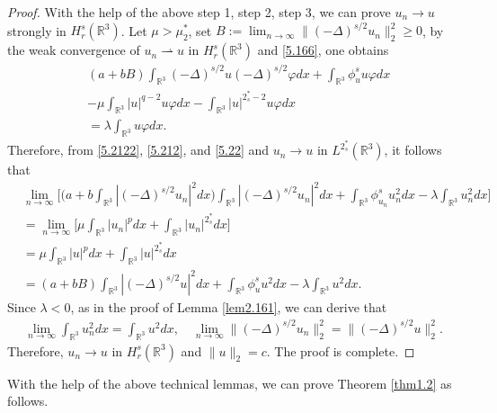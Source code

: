 \begin{proof}
With the help  of  the above step 1, step 2, step 3, we can prove $u_n\to u$ 
strongly in $H^s_r(\mathbb{R}^3)$. Let $\mu>\mu^*_2$, set 
$B:=\lim_{n\to\infty} \|(-\Delta)^{s/2}u_n\|^2_2\geq 0 $, by the weak convergence of 
$u_n\rightharpoonup u$ in  $H^s_r(\mathbb{R}^3)$ and  \eqref{5.166}, one obtains
\begin{equation}\label{5.22}
\begin{split}
&(a+bB)\int_{\mathbb{R}^3}(-\Delta)^{s/2}u(-\Delta)^{s/2}\varphi dx
 +\int_{\mathbb{R}^3}\phi^s_{u}u\varphi dx\\
&-\mu \int_{\mathbb{R}^3}|u|^{q-2}u\varphi dx
 -\int_{\mathbb{R}^3}|u|^{2^*_s-2}u\varphi dx \\
&=\lambda \int_{\mathbb{R}^3} u\varphi dx.
\end{split}
\end{equation}
Therefore, from \eqref{5.2122}, \eqref{5.212}, and \eqref{5.22} and 
$u_n\to u$ in $L^{2^*_s}(\mathbb{R}^3)$, it follows that
\begin{align*} %
&\lim_{n\to\infty}\Big[\Big(a+b\int_{\mathbb{R}^3}|(-\Delta)^{s/2}u_n|^2dx\Big)
 \int_{\mathbb{R}^3}|(-\Delta)^{s/2}u_n|^2 dx
 +\int_{\mathbb{R}^3}\phi^s_{u_n}{u^2_n}dx
 -\lambda \int_{\mathbb{R}^3} {u^2_n} dx\Big]\\
&=\lim_{n\to\infty}\Big [\mu \int_{\mathbb{R}^3}|u_n|^{p}dx
 +\int_{\mathbb{R}^3}|u_n|^{2^*_s} dx\Big]\\
&=\mu \int_{\mathbb{R}^3}|u|^{p}dx+\int_{\mathbb{R}^3}|u|^{2^*_s} dx\\
&=(a+bB)\int_{\mathbb{R}^3}|(-\Delta)^{s/2}u|^2 dx
 +\int_{\mathbb{R}^3}\phi^s_{u}{u^2}dx
 -\lambda \int_{\mathbb{R}^3} {u^2} dx.
\end{align*}
Since $\lambda<0$, as in the proof of Lemma {\ref{lem2.161}},  
we can derive that
\begin{align*} %
\lim_{n\to\infty} \int_{\mathbb{R}^3} {u^2_n} dx
= \int_{\mathbb{R}^3} {u^2} dx,\quad
\lim_{n\to\infty}  \|(-\Delta)^{s/2}u_n\|^2_2 = \|(-\Delta)^{s/2}u\|^2_2.
\end{align*}
Therefore, $u_n\to u$ in $H^s_{r}(\mathbb{R}^3)$ and $\|u\|_2=c$. 
The proof is complete.
\end{proof}

With the help of the above technical lemmas, we can prove Theorem \ref{thm1.2} 
as follows.

